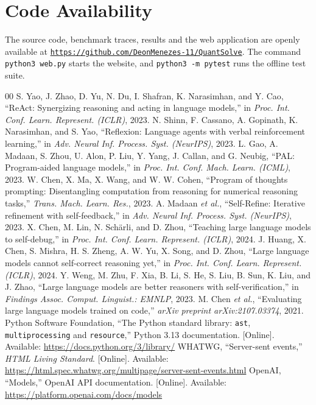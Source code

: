 \documentclass[conference]{IEEEtran}
\begin{document}
\section*{Code Availability}
The source code, benchmark traces, results and the web application are openly available at \href{https://github.com/DeonMenezes-11/QuantSolve}{\nolinkurl{https://github.com/DeonMenezes-11/QuantSolve}}. The command \texttt{python3 web.py} starts the website, and \texttt{python3 -m pytest} runs the offline test suite.

\begin{thebibliography}{00}
 S. Yao, J. Zhao, D. Yu, N. Du, I. Shafran, K. Narasimhan, and Y. Cao, ``ReAct: Synergizing reasoning and acting in language models,'' in \emph{Proc. Int. Conf. Learn. Represent. (ICLR)}, 2023.
 N. Shinn, F. Cassano, A. Gopinath, K. Narasimhan, and S. Yao, ``Reflexion: Language agents with verbal reinforcement learning,'' in \emph{Adv. Neural Inf. Process. Syst. (NeurIPS)}, 2023.
 L. Gao, A. Madaan, S. Zhou, U. Alon, P. Liu, Y. Yang, J. Callan, and G. Neubig, ``PAL: Program-aided language models,'' in \emph{Proc. Int. Conf. Mach. Learn. (ICML)}, 2023.
 W. Chen, X. Ma, X. Wang, and W. W. Cohen, ``Program of thoughts prompting: Disentangling computation from reasoning for numerical reasoning tasks,'' \emph{Trans. Mach. Learn. Res.}, 2023.
 A. Madaan \emph{et al.}, ``Self-Refine: Iterative refinement with self-feedback,'' in \emph{Adv. Neural Inf. Process. Syst. (NeurIPS)}, 2023.
 X. Chen, M. Lin, N. Sch\"arli, and D. Zhou, ``Teaching large language models to self-debug,'' in \emph{Proc. Int. Conf. Learn. Represent. (ICLR)}, 2024.
 J. Huang, X. Chen, S. Mishra, H. S. Zheng, A. W. Yu, X. Song, and D. Zhou, ``Large language models cannot self-correct reasoning yet,'' in \emph{Proc. Int. Conf. Learn. Represent. (ICLR)}, 2024.
 Y. Weng, M. Zhu, F. Xia, B. Li, S. He, S. Liu, B. Sun, K. Liu, and J. Zhao, ``Large language models are better reasoners with self-verification,'' in \emph{Findings Assoc. Comput. Linguist.: EMNLP}, 2023.
 M. Chen \emph{et al.}, ``Evaluating large language models trained on code,'' \emph{arXiv preprint arXiv:2107.03374}, 2021.
 Python Software Foundation, ``The Python standard library: \texttt{ast}, \texttt{multiprocessing} and \texttt{resource},'' Python 3.13 documentation. [Online]. Available: \url{https://docs.python.org/3/library/}
 WHATWG, ``Server-sent events,'' \emph{HTML Living Standard}. [Online]. Available: \url{https://html.spec.whatwg.org/multipage/server-sent-events.html}
 OpenAI, ``Models,'' OpenAI API documentation. [Online]. Available: \url{https://platform.openai.com/docs/models}
\end{thebibliography}
\end{document}
